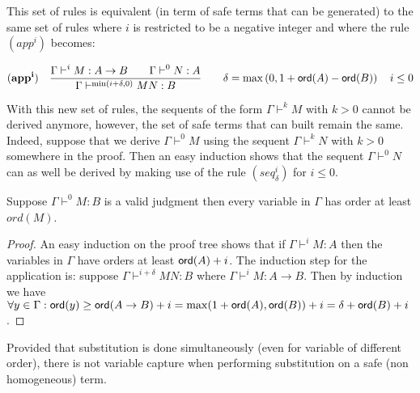 \begin{rem}
\label{rem:rulesineg}

This set of rules is equivalent (in term of safe terms that can be
generated) to the same set of rules where $i$ is restricted to be a
negative integer and where the rule $(app^i)$ becomes:

$$ \mathbf{(app^i)} \quad  \frac{\displaystyle \Gamma \vdash^i M : A\rightarrow B
                                        \qquad \Gamma \vdash^{0} N : A}{\Gamma  \vdash^{\min(i+\delta,0)} M N : B}
                                    \qquad
                                   \delta = \max\left(0, 1 + {\sf ord}(A) - {\sf ord}(B)\right) \quad i \leq 0 $$

With this new set of rules, the sequents of the form $\Gamma
\vdash^{k} M$ with $k>0$ cannot be derived anymore, however, the set
of safe terms that can built remain the same. Indeed, suppose that
we derive $\Gamma \vdash^0 M$ using the sequent $\Gamma \vdash^k N$
with $k>0$ somewhere in the proof. Then an easy induction shows that
the sequent $\Gamma \vdash^0 N$ can as well be derived by making use
of the rule $(seq^i_\delta)$ for $i\leq 0$.
\end{rem}

\begin{lem}
\label{lem:nonhomosafe_basic_prop} Suppose $\Gamma \vdash^0 M : B$
is a valid judgment then every variable in $\Gamma$ has order at
least $ord(M)$.
\end{lem}
\begin{proof}
An easy induction on the proof tree shows that if $\Gamma \vdash^{i}
M : A$ then the variables in $\Gamma$ have orders at least
${\sf ord}(A)+i$. The induction step for the application is: suppose
$\Gamma  \vdash^{i+\delta} M N : B$ where $\Gamma \vdash^i M :
A\rightarrow B$. Then by induction we have $\forall y \in \Gamma :
{\sf ord}(y) \geq {\sf ord}(A\rightarrow B) + i = \max(1+{\sf ord}(A), {\sf ord}(B))+i =
\delta + {\sf ord}(B) + i$.
\end{proof}

\begin{lem}
Provided that substitution is done simultaneously (even for variable
of different order), there is not variable capture when performing
substitution on a safe (non homogeneous) term.
\end{lem}

